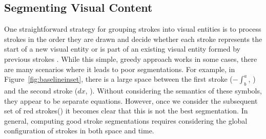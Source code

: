 \subsection{Segmenting Visual Content}
\label{sec:segmentation}
One straightforward strategy for grouping strokes into visual entities
is to process strokes in the order they are drawn and decide whether
each stroke represents the start of a new visual entity or is part of
an existing visual entity formed by previous strokes \cite{mynatt1999flatland}.
While this simple, greedy approach works in some cases, there are many
scenarios where it leads to poor segmentations. For example, in
Figure~\ref{fig:baselineinset}, there is a large space between the first stroke ($-\int^a_b$, ) and the second stroke ($dx$, ). Without considering the semantics of these symbols, 
they appear to be separate equations. However, once we consider 
the subsequent set of red strokes()
 it becomes clear that this is not the best segmentation. In general, computing good stroke segmentations requires considering
the global configuration of strokes in both space and time. \\

